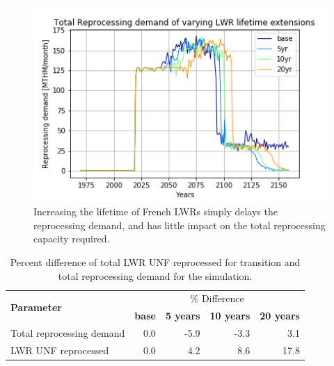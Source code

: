 \begin{figure}[htbp!]
    \begin{center}
        \includegraphics[scale=0.7]{./images/sensitivity/ext_tot_rep.png}
    \end{center}
    \caption{Increasing the lifetime of French \glspl{LWR} simply delays the
             reprocessing demand, and has little impact on the total 
     reprocessing capacity required.}
    \label{fig:ext_all}
\end{figure}

\begin{table}[h]
	\centering
	\caption{Percent difference of total \gls{LWR} \gls{UNF} reprocessed
		for transition and total reprocessing demand for the simulation.}
	\begin{tabular}{lrrrr}
		\hline
		\multirow{2}{*}{\textbf{Parameter}} & \multicolumn{4}{c}{\% Difference} \\
		& \textbf{base}& \textbf{5 years} & \textbf{10 years} & \textbf{20 years} \\
		\hline
		Total reprocessing demand & 0.0 & -5.9 & -3.3 & 3.1 \\
		\gls{LWR} \gls{UNF} reprocessed & 0.0  & 4.2 & 8.6 & 17.8 \\
		\hline
	\end{tabular}
	\label{tab:ext_diff}
\end{table}

